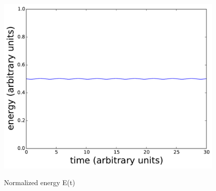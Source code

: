 \begin{figure}
{            \includegraphics[scale=0.24]{fig/ho/ho_E(t)_euler_symplectic.pdf}
            \label{fig:ho_E(t)_euler_symplectic}
        }
        \caption{Normalized energy E(t)}
    \label{fig:ho_E(t)_euler}
\end{figure}


